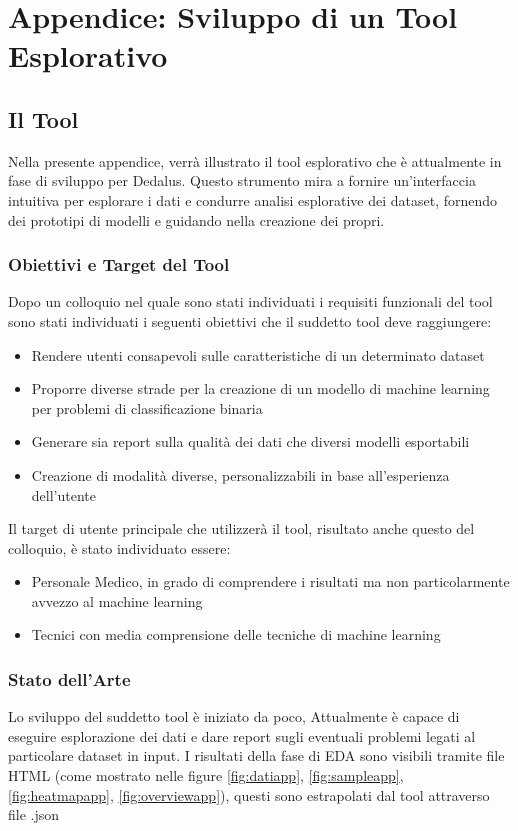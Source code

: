 \chapter{Appendice: Sviluppo di un Tool Esplorativo}
\section{Il Tool }
Nella presente appendice, verrà illustrato il tool esplorativo che è attualmente in fase di sviluppo per Dedalus.
Questo strumento mira a fornire un'interfaccia intuitiva  per esplorare i dati e condurre analisi esplorative dei dataset, fornendo dei prototipi di modelli e guidando nella creazione dei propri.

\subsection{Obiettivi e Target del Tool}
Dopo un colloquio nel quale sono stati individuati i requisiti funzionali del tool sono stati individuati i seguenti obiettivi che il suddetto tool deve raggiungere:
\begin{itemize}
    \item Rendere utenti consapevoli sulle caratteristiche di un determinato dataset

    \item Proporre diverse strade per la creazione di un modello di machine learning per problemi di classificazione binaria

    \item Generare sia report sulla qualità dei dati che diversi modelli esportabili

    \item Creazione di modalità diverse, personalizzabili in base all’esperienza dell’utente
\end{itemize}

Il target di utente principale che utilizzerà il tool, risultato anche questo del colloquio, è stato individuato essere:
\begin{itemize}
    \item Personale Medico, in grado di comprendere i risultati ma non particolarmente avvezzo al machine learning

    \item Tecnici con media comprensione delle tecniche di machine learning 
\end{itemize}
\subsection{Stato dell'Arte}
Lo sviluppo del suddetto tool è iniziato da poco, Attualmente  è capace di eseguire esplorazione dei dati e dare report sugli eventuali problemi legati al particolare dataset in input.
I risultati della fase di EDA sono visibili tramite file HTML (come mostrato nelle figure \ref{fig:datiapp}, \ref{fig:sampleapp}, \ref{fig:heatmapapp}, \ref{fig:overviewapp}), questi sono estrapolati dal tool attraverso file .json

